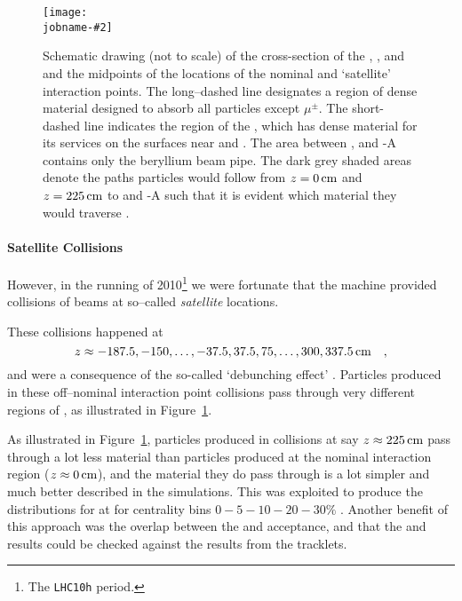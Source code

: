 \documentclass[compat,11pt]{alicenote}
\newcommand{\figref}[1]{Figure~\ref{#1}}
\newcommand\figinput[2][\textwidth]{%
  \texttt{[image: \\jobname-\#2]}}
\begin{document}
\begin{figure}[th!bp]
  \centering
  \figinput{satellite}
  \caption{Schematic drawing (not to scale) of the cross-section of
    the \ITS{}, \FMD{}, and \VZERO{} and the midpoints of the
    locations of the nominal and `satellite' interaction points. The
    long--dashed line designates a region of dense material designed
    to absorb all particles except $\mu^{\pm}$. The short-dashed line
    indicates the region of the \ALICE{} \ITS{}, which has dense
    material for its services on the surfaces near  and
    . The area between ,  and \VZERO{}-A contains
    only the beryllium beam pipe. The dark grey shaded areas denote
    the paths particles would follow from $z=\unit[0]{\text{cm}}$ and
    $z=\unit[225]{\text{cm}}$ to  and \VZERO{}-A such that it
    is evident which material they would traverse
    \cite{Abbas:2013bpa}.}
  \label{fig:satellite_geom}
\end{figure}

\paragraph{Satellite Collisions} 
However, in the \PbPbCol{} running of 2010\footnote{The
  \texttt{LHC10h} period.} we were fortunate that the machine provided
collisions of beams at so--called \emph{satellite} locations.

These collisions happened at
$$
z \approx -187.5, -150, \ldots, -37.5, 37.5, 75, \ldots, 300,
\unit[337.5]{\text{cm}} \quad, 
$$ 
and were a consequence of the so-called `debunching effect'
\cite{maxime}.  Particles produced in these off--nominal interaction
point collisions pass through very different regions of \ALICE{}, as
illustrated in \figref{fig:satellite_geom}.  

As illustrated in \figref{fig:satellite_geom}, particles produced in
collisions at say $z\approx\unit[225]{\text{cm}}$ pass through a lot
less material than particles produced at the nominal interaction
region ($z\approx\unit[0]{\text{cm}}$), and the material they do pass
through is a lot simpler and much better described in the simulations.
This was exploited to produce the \ndndeta{} distributions for
\PbPbCol{} at  for centrality bins $0-5-10-20-30\%$
\cite{Abbas:2013bpa}.  Another benefit of this approach was the
overlap between the \FMD{} and \VZERO{} acceptance, and that the
\VZERO{} and \FMD{} results could be checked against the results from
the \SPD{} tracklets.
\end{document}

